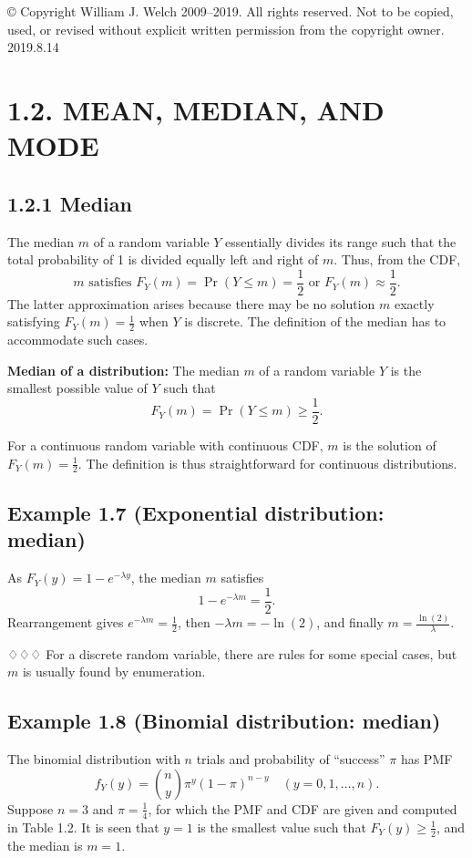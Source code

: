 © Copyright William J. Welch 2009--2019. All rights reserved. Not to be copied, used, or revised without explicit written permission from the copyright owner. 2019.8.14

\section{1.2. MEAN, MEDIAN, AND MODE}

\subsection{1.2.1 Median}
The median $m$ of a random variable $Y$ essentially divides its range such that the total probability of 1 is divided equally left and right of $m$. Thus, from the CDF,
\[
m \text{ satisfies } F_Y(m) = \Pr(Y \leq m) = \frac{1}{2} \text{ or } F_Y(m) \approx \frac{1}{2}.
\]
The latter approximation arises because there may be no solution $m$ exactly satisfying $F_Y(m) = \frac{1}{2}$ when $Y$ is discrete. The definition of the median has to accommodate such cases.

\begin{definition}
\textbf{Median of a distribution:} The median $m$ of a random variable $Y$ is the smallest possible value of $Y$ such that
\[
F_Y(m) = \Pr(Y \leq m) \geq \frac{1}{2}. 
\]
\end{definition}
For a continuous random variable with continuous CDF, $m$ is the solution of $F_Y(m) = \frac{1}{2}$. The definition is thus straightforward for continuous distributions. 

\subsection{Example 1.7 (Exponential distribution: median)}
As $F_Y(y) = 1 - e^{-\lambda y}$, the median $m$ satisfies 
\[
1 - e^{-\lambda m} = \frac{1}{2}.
\]
Rearrangement gives $e^{-\lambda m} = \frac{1}{2}$, then $-\lambda m = -\ln(2)$, and finally $m = \frac{\ln(2)}{\lambda}$.

♢♢♢
For a discrete random variable, there are rules for some special cases, but $m$ is usually found by enumeration. 

\subsection{Example 1.8 (Binomial distribution: median)}
The binomial distribution with $n$ trials and probability of “success” $\pi$ has PMF
\[
f_Y(y) = \binom{n}{y} \pi^y (1-\pi)^{n-y} \quad (y = 0, 1, \ldots, n).
\]
Suppose $n = 3$ and $\pi = \frac{1}{4}$, for which the PMF and CDF are given and computed in Table 1.2. It is seen that $y = 1$ is the smallest value such that $F_Y(y) \geq \frac{1}{2}$, and the median is $m = 1$. 


